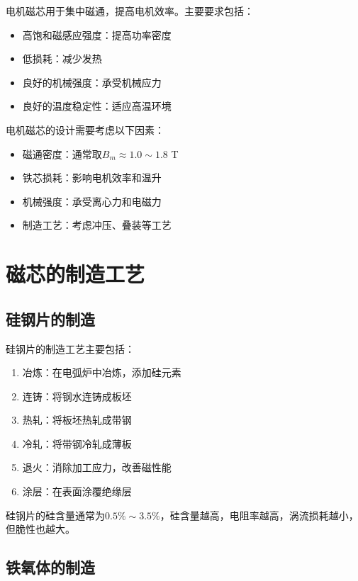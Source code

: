 \documentclass[12pt,UTF8]{ctexbook}
\begin{document}
电机磁芯用于集中磁通，提高电机效率。主要要求包括：

\begin{itemize}[leftmargin=2cm]
    \item 高饱和磁感应强度：提高功率密度
    \item 低损耗：减少发热
    \item 良好的机械强度：承受机械应力
    \item 良好的温度稳定性：适应高温环境
\end{itemize}

电机磁芯的设计需要考虑以下因素：

\begin{itemize}[leftmargin=2cm]
    \item 磁通密度：通常取$B_m \approx 1.0 \sim 1.8$ T
    \item 铁芯损耗：影响电机效率和温升
    \item 机械强度：承受离心力和电磁力
    \item 制造工艺：考虑冲压、叠装等工艺
\end{itemize}

\section{磁芯的制造工艺}

\subsection{硅钢片的制造}

硅钢片的制造工艺主要包括：

\begin{enumerate}[leftmargin=2cm]
    \item 冶炼：在电弧炉中冶炼，添加硅元素
    \item 连铸：将钢水连铸成板坯
    \item 热轧：将板坯热轧成带钢
    \item 冷轧：将带钢冷轧成薄板
    \item 退火：消除加工应力，改善磁性能
    \item 涂层：在表面涂覆绝缘层
\end{enumerate}

硅钢片的硅含量通常为$0.5\% \sim 3.5\%$，硅含量越高，电阻率越高，涡流损耗越小，但脆性也越大。

\subsection{铁氧体的制造}
\end{document}
